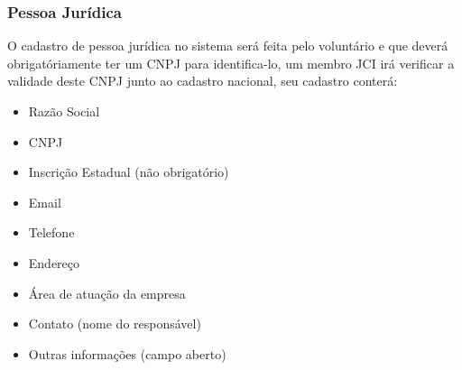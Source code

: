       \subsubsection{Pessoa Jurídica}
      O cadastro de pessoa jurídica no sistema será feita pelo voluntário e que deverá obrigatóriamente ter um CNPJ para identifica-lo, um membro JCI irá verificar 
      a validade deste CNPJ junto ao cadastro nacional, seu cadastro conterá:
        \begin{itemize}
          \item Razão Social
          \item CNPJ
          \item Inscrição Estadual (não obrigatório)
          \item Email
          \item Telefone
          \item Endereço
          \item Área de atuação da empresa
          \item Contato (nome do responsável)
          \item Outras informações (campo aberto)
        \end{itemize}

